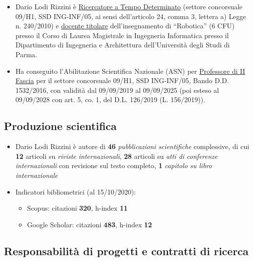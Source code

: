 \documentclass[11pt]{article}
\begin{document}
\begin{itemize}
\item Dario Lodi Rizzini \`e \ul{Ricercatore a Tempo Determinato} (settore concorsuale 09/H1, SSD ING-INF/05, ai sensi dell'articolo 24, comma 3, lettera a) Legge  n. 240/2010) 
e \ul{docente titolare} dell'insegnamento di ``Robotica'' (6 CFU) presso il Corso di Laurea Magistrale in Ingegneria Informatica 
presso il Dipartimento di Ingegneria e Architettura dell'Universit\`a degli Studi di Parma. 

\item Ha conseguito l'Abilitazione Scientifica Nazionale (ASN) per \ul{Professore di II Fascia} per il settore concorsuale 09/H1, SSD ING-INF/05, Bando D.D. 1532/2016, con validit\`a dal 09/09/2019 al 09/09/2025 (poi esteso al 09/09/2028 con art. 5, co. 1, del D.L. 126/2019 (L. 156/2019)).
\end{itemize}


\subsection*{Produzione scientifica}

\begin{itemize}
\item Dario Lodi Rizzini \`e autore di \textbf{46} \emph{pubblicazioni scientifiche} complessive, di cui 
  \textbf{12} articoli su \emph{riviste internazionali}, 
  \textbf{28} articoli su \emph{atti di conferenze internazionali} con revisione sul testo completo,
  \textbf{1} \emph{capitolo su libro internazionale}

\item Indicatori bibliometrici (al 15/10/2020): 
  \begin{itemize}
  \item Scopus: citazioni \textbf{320}, h-index \textbf{11}
  \item Google Scholar: citazioni \textbf{483}, h-index \textbf{12}
  \end{itemize}
\end{itemize}


\subsection*{Responsabilit\`a di progetti e contratti di ricerca}
\end{document}
